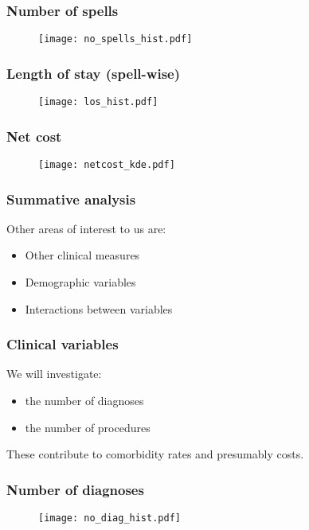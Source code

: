 \begin{frame}
    \frametitle{Number of spells}

    \begin{figure}
    \texttt{[image: no\_spells\_hist.pdf]}
    \end{figure}
\end{frame}

\begin{frame}
    \frametitle{Length of stay (spell-wise)}

    \begin{figure}
    \texttt{[image: los\_hist.pdf]}
    \end{figure}
\end{frame}

\begin{frame}
    \frametitle{Net cost}

    \begin{figure}
    \texttt{[image: netcost\_kde.pdf]}
    \end{figure}
\end{frame}

\begin{frame}
    \frametitle{Summative analysis}
    Other areas of interest to us are:
    \begin{itemize}
        \item Other clinical measures
        \item Demographic variables
        \item Interactions between variables
    \end{itemize}
\end{frame}

\begin{frame}
    \frametitle{Clinical variables}

    We will investigate:
    \begin{itemize}
        \item the number of diagnoses
        \item the number of procedures
    \end{itemize}

    \pause%
    These contribute to comorbidity rates and presumably costs.
\end{frame}

\begin{frame}
    \frametitle{Number of diagnoses}

    \begin{figure}
    \texttt{[image: no\_diag\_hist.pdf]}
    \end{figure}
\end{frame}

